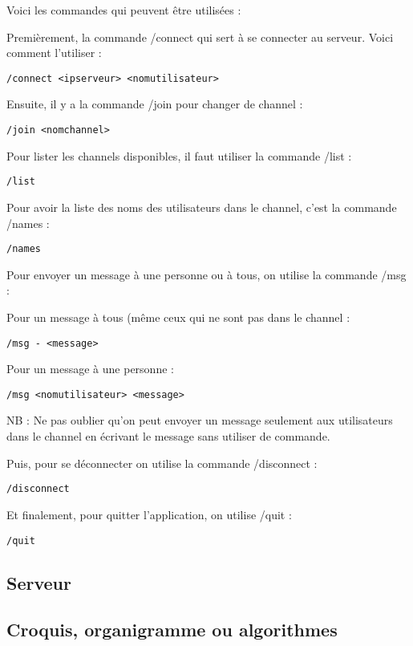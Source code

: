 \documentclass[12pt,french]{article}
\begin{document}
            Voici les commandes qui peuvent être utilisées : 


            Premièrement, la commande /connect qui sert à se connecter au serveur. Voici comment l'utiliser :


            {\tt /connect <ipserveur> <nomutilisateur>}


            Ensuite, il y a la commande /join pour changer de channel :


            {\tt /join <nomchannel>}


            Pour lister les channels disponibles, il faut utiliser la commande /list :


            {\tt /list}


            Pour avoir la liste des noms des utilisateurs dans le channel, c'est la commande /names :


            {\tt /names}


            Pour envoyer un message à une personne ou à tous, on utilise la commande /msg :


            Pour un message à tous (même ceux qui ne sont pas dans le channel :


            {\tt /msg - <message>}


            Pour un message à une personne :


            {\tt /msg <nomutilisateur> <message>}


            NB : Ne pas oublier qu'on peut envoyer un message seulement aux utilisateurs dans le channel en écrivant le message sans utiliser de commande.


            Puis, pour se déconnecter on utilise la commande /disconnect :


            {\tt /disconnect}


            Et finalement, pour quitter l'application, on utilise /quit :


            {\tt /quit}


        \subsection{Serveur} %
        \label{sub:serveur}


        \subsection{Croquis, organigramme ou algorithmes} %
        \label{sub:croquis-org-algo}
\end{document}
